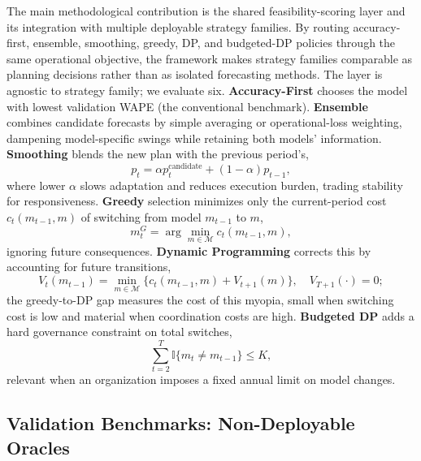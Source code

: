 The main methodological contribution is the shared feasibility-scoring layer and its integration with multiple deployable strategy families. By routing accuracy-first, ensemble, smoothing, greedy, DP, and budgeted-DP policies through the same operational objective, the framework makes strategy families comparable as planning decisions rather than as isolated forecasting methods. The layer is agnostic to strategy family; we evaluate six. \textbf{Accuracy-First} chooses the model with lowest validation WAPE (the conventional benchmark). \textbf{Ensemble} combines candidate forecasts by simple averaging or operational-loss weighting, dampening model-specific swings while retaining both models' information. \textbf{Smoothing} blends the new plan with the previous period's,
\begin{equation}
p_t=\alpha p_t^{\mathrm{candidate}}+(1-\alpha)p_{t-1},
\end{equation}
where lower $\alpha$ slows adaptation and reduces execution burden, trading stability for responsiveness. \textbf{Greedy} selection minimizes only the current-period cost $c_t(m_{t-1},m)$ of switching from model $m_{t-1}$ to $m$,
\begin{equation}
m_t^{G}=\arg\min_{m\in\mathcal{M}} c_t(m_{t-1},m),
\end{equation}
ignoring future consequences. \textbf{Dynamic Programming} corrects this by accounting for future transitions,
\begin{equation}
V_t(m_{t-1})=\min_{m\in\mathcal{M}}\{c_t(m_{t-1},m)+V_{t+1}(m)\}, \quad V_{T+1}(\cdot)=0;
\end{equation}
the greedy-to-DP gap measures the cost of this myopia, small when switching cost is low and material when coordination costs are high. \textbf{Budgeted DP} adds a hard governance constraint on total switches,
\begin{equation}
\sum_{t=2}^{T}\mathbb{I}\{m_t\neq m_{t-1}\}\leq K,
\end{equation}
relevant when an organization imposes a fixed annual limit on model changes.

\subsection{Validation Benchmarks: Non-Deployable Oracles}
\label{sec:oracles}

